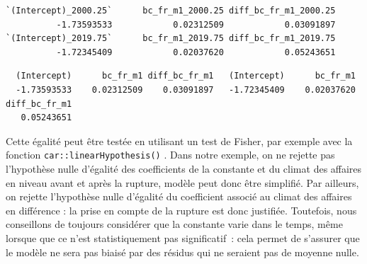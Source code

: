 \documentclass[
  a4paper,
  DIV=11,
  numbers=noendperiod,
  french]{scrartcl}
\newenvironment{Shaded}{\begin{snugshade}}{\end{snugshade}}
\newcommand{\AttributeTok}[1]{\textcolor[rgb]{0.40,0.45,0.13}{#1}}
\newcommand{\DecValTok}[1]{\textcolor[rgb]{0.68,0.00,0.00}{#1}}
\newcommand{\FunctionTok}[1]{\textcolor[rgb]{0.28,0.35,0.67}{#1}}
\newcommand{\NormalTok}[1]{\textcolor[rgb]{0.00,0.23,0.31}{#1}}
\newcommand{\OtherTok}[1]{\textcolor[rgb]{0.00,0.23,0.31}{#1}}
\newcommand{\SpecialCharTok}[1]{\textcolor[rgb]{0.37,0.37,0.37}{#1}}
\newcommand{\StringTok}[1]{\textcolor[rgb]{0.13,0.47,0.30}{#1}}
\newcommand\1{{\mathds 1}}
\theoremstyle{remark}
\begin{document}
\begin{Shaded}
\end{Shaded}

\begin{verbatim}
`(Intercept)_2000.25`      bc_fr_m1_2000.25 diff_bc_fr_m1_2000.25 
          -1.73593533            0.02312509            0.03091897 
`(Intercept)_2019.75`      bc_fr_m1_2019.75 diff_bc_fr_m1_2019.75 
          -1.72345409            0.02037620            0.05243651 
\end{verbatim}

\begin{Shaded}
\end{Shaded}

\begin{verbatim}
  (Intercept)      bc_fr_m1 diff_bc_fr_m1   (Intercept)      bc_fr_m1 
  -1.73593533    0.02312509    0.03091897   -1.72345409    0.02037620 
diff_bc_fr_m1 
   0.05243651 
\end{verbatim}

Cette égalité peut être testée en utilisant un test de Fisher, par
exemple avec la fonction \texttt{car::linearHypothesis()}
\autocite{car}. Dans notre exemple, on ne rejette pas l'hypothèse nulle
d'égalité des coefficients de la constante et du climat des affaires en
niveau avant et après la rupture, modèle peut donc être simplifié. Par
ailleurs, on rejette l'hypothèse nulle d'égalité du coefficient associé
au climat des affaires en différence : la prise en compte de la rupture
est donc justifiée. Toutefois, nous conseillons de toujours considérer
que la constante varie dans le temps, même lorsque que ce n'est
statistiquement pas significatif~: cela permet de s'assurer que le
modèle ne sera pas biaisé par des résidus qui ne seraient pas de moyenne
nulle.

\begin{Shaded}
\end{Shaded}
\end{document}
